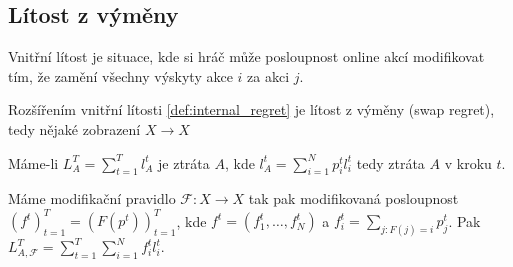 \subsection{Lítost z výměny}
\begin{definition}\label{def:internal_regret}
Vnitřní lítost je situace, kde si hráč může posloupnost online akcí modifikovat tím, že zamění všechny výskyty akce $i$ za akci $j$. 
\end{definition}
\begin{definition}\label{def:swap_regret}
    Rozšířením vnitřní lítosti \ref{def:internal_regret} je lítost z výměny (swap regret), tedy nějaké zobrazení $X \rightarrow X$ 

    Máme-li $L^T_A = \sum^T_{t=1} l_A^t$ je ztráta $A$, kde $l^t_A = \sum^N_{i=1} p_i^t l_i^t$ tedy ztráta $A$ v kroku $t$. 

    Máme modifikační pravidlo $\mathcal{F}: X \rightarrow X$ tak pak modifikovaná posloupnost $(f^t)^T_{t=1} = (F(p^t))^T_{t=1}$, kde $f^t = (f_1^t, \dots, f_N^t)$ a $f^t_i = \sum_{j: F(j) = i} p_j^t$. 
    Pak $L^T_{A,\mathcal{F}} = \sum_{t=1}^T \sum_{i=1}^N f_i^t l_i^t$. 
\end{definition}

